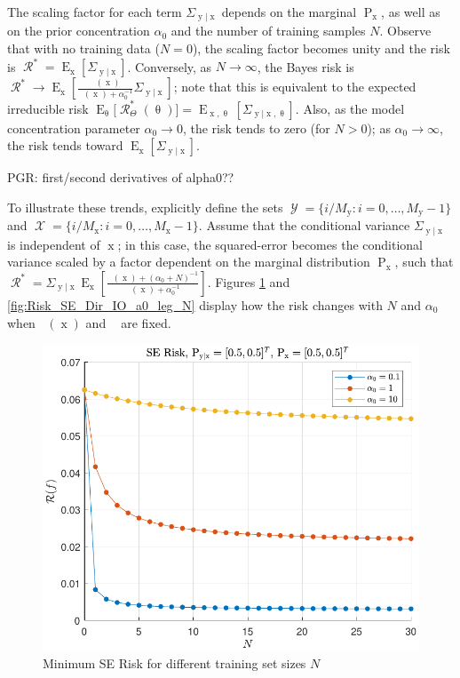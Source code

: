 \documentclass[12pt]{report}
\DeclareMathOperator{\xrm}{\mathrm{x}}
\DeclareMathOperator{\yrm}{\mathrm{y}}
\DeclareMathOperator{\Prm}{\mathrm{P}}
\DeclareMathOperator{\Erm}{\mathrm{E}}
\DeclareMathOperator{\Xcal}{\mathcal{X}}
\DeclareMathOperator{\Ycal}{\mathcal{Y}}
\DeclareMathOperator{\Rcal}{\mathcal{R}}
\DeclareMathOperator{\alpham}{\alpha_\text{m}}
\DeclareMathOperator{\alphac}{\alpha_\text{c}}
\begin{document}
The scaling factor for each term $\Sigma_{\yrm | \xrm}$ depends on the marginal $\Prm_{\xrm}$, as well as on the prior concentration $\alpha_0$ and the number of training samples $N$. Observe that with no training data ($N = 0$), the scaling factor becomes unity and the risk is $\Rcal^* = \Erm_{\xrm} \left[ \Sigma_{\yrm | \xrm} \right]$. Conversely, as $N \to \infty$, the Bayes risk is $\Rcal^* \to \Erm_{\xrm} \left[ \frac{\alpham(\xrm)}{\alpham(\xrm) + \alpha_0^{-1}} \Sigma_{\yrm | \xrm} \right]$; note that this is equivalent to the expected irreducible risk  $\Erm_{\uptheta}\big[\Rcal_{\Theta}^*(\uptheta)\big] = \Erm_{\xrm,\uptheta} \left[ \Sigma_{\yrm | \xrm,\uptheta} \right]$. Also, as the model concentration parameter $\alpha_0 \to 0$, the risk tends to zero (for $N > 0$); as $\alpha_0 \to \infty$, the risk tends toward $\Erm_{\xrm} \left[ \Sigma_{\yrm | \xrm} \right]$.

PGR: first/second derivatives of alpha0??

To illustrate these trends, explicitly define the sets $\Ycal = \{ i/M_{\yrm} : i = 0,\ldots,M_{\yrm}-1 \}$ and $\Xcal = \{ i/M_{\xrm} : i = 0,\ldots,M_{\xrm}-1 \}$. Assume that the conditional variance $\Sigma_{\yrm | \xrm}$ is independent of $\xrm$; in this case, the squared-error becomes the conditional variance scaled by a factor dependent on the marginal distribution $\Prm_{\xrm}$, such that $\Rcal^* = \Sigma_{\yrm | \xrm} \Erm_{\xrm} \left[ \frac{\alpham(\xrm) + (\alpha_0+N)^{-1}}{\alpham(\xrm) + \alpha_0^{-1}} \right]$.  Figures \ref{fig:Risk_SE_Dir_IO_N_leg_a0} and \ref{fig:Risk_SE_Dir_IO_a0_leg_N} display how the risk changes with $N$ and $\alpha_0$ when $\alphac(\xrm)$ and $\alpham$ are fixed.

\begin{figure}
\centering
\includegraphics[width=0.7\linewidth]{Risk_SE_Dir_IO_N_leg_a0.pdf}
\caption{Minimum SE Risk for different training set sizes $N$}
\label{fig:Risk_SE_Dir_IO_N_leg_a0}
\end{figure}
\end{document}
